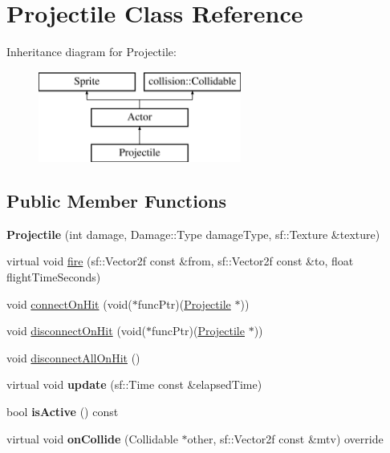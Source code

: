 \hypertarget{class_projectile}{}\section{Projectile Class Reference}
\label{class_projectile}
Inheritance diagram for Projectile\+:\begin{figure}[H]
\begin{center}
\leavevmode
\includegraphics[height=3.000000cm]{class_projectile}
\end{center}
\end{figure}
\subsection*{Public Member Functions}
\begin{DoxyCompactItemize}
\item 
\hypertarget{class_projectile_aefbc88e9f5b265e2c6cfc44af101a1e4}{}{\bfseries Projectile} (int damage, Damage\+::\+Type damage\+Type, sf\+::\+Texture \&texture)\label{class_projectile_aefbc88e9f5b265e2c6cfc44af101a1e4}

\item 
virtual void \hyperlink{class_projectile_ae7af649786b87d205e96f11eb992f078}{fire} (sf\+::\+Vector2f const \&from, sf\+::\+Vector2f const \&to, float flight\+Time\+Seconds)
\item 
void \hyperlink{class_projectile_a7cea27d367f2ce5c4e4845938db540e8}{connect\+On\+Hit} (void($\ast$func\+Ptr)(\hyperlink{class_projectile}{Projectile} $\ast$))
\item 
void \hyperlink{class_projectile_a8d1d09f473c63567b8a47a7e0de12854}{disconnect\+On\+Hit} (void($\ast$func\+Ptr)(\hyperlink{class_projectile}{Projectile} $\ast$))
\item 
void \hyperlink{class_projectile_a4dbf5fa734587fc2a73a59a78cbb5671}{disconnect\+All\+On\+Hit} ()
\item 
\hypertarget{class_projectile_a0c12c1623571d3e94db79b89253c0968}{}virtual void {\bfseries update} (sf\+::\+Time const \&elapsed\+Time)\label{class_projectile_a0c12c1623571d3e94db79b89253c0968}

\item 
\hypertarget{class_projectile_a90f062dbd2e6e09bc9462fcc8e6053aa}{}bool {\bfseries is\+Active} () const \label{class_projectile_a90f062dbd2e6e09bc9462fcc8e6053aa}

\item 
\hypertarget{class_projectile_ab99348429612933f198a070b16c1fc1c}{}virtual void {\bfseries on\+Collide} (Collidable $\ast$other, sf\+::\+Vector2f const \&mtv) override\label{class_projectile_ab99348429612933f198a070b16c1fc1c}

\end{DoxyCompactItemize}

